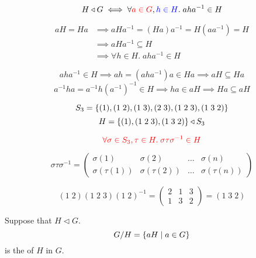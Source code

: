 \begin{frame}
  \begin{theorem}
    \[
      H \triangleleft G \iff \forall \textcolor{red}{a \in G}, \textcolor{blue}{h \in H}.\; aha^{-1} \in H
    \]
  \end{theorem}

  \pause
  \begin{align*}
    aH = Ha &\implies aHa^{-1} = (Ha)a^{-1} = H(aa^{-1}) = H \\
            &\implies aHa^{-1} \subseteq H \\
            &\implies \forall h \in H.\; aha^{-1} \in H
  \end{align*}

  \pause
  \[
    aha^{-1} \in H \implies ah = (aha^{-1})a \in Ha \implies aH \subseteq Ha
  \]
  \pause
  \[
    a^{-1}ha = a^{-1}h(a^{-1})^{-1} \in H \implies ha \in aH \implies Ha \subseteq aH
  \]
\end{frame}

\begin{frame}
  \begin{exampleblock}{}
    \[
      S_{3} = \{(1), (1\; 2), (1\; 3), (2\; 3), (1\; 2\; 3), (1\; 3\; 2)\}
    \]
    \[
      H = \{(1), (1\; 2\; 3), (1\; 3\; 2)\} \triangleleft S_{3}
    \]
  \end{exampleblock}

  \pause
  \[
    \textcolor{red}{\forall \sigma \in S_{3}, \tau \in H.\; \sigma \tau \sigma^{-1} \in H}
  \]

  \pause
  \begin{theorem}
    \[
      \sigma \tau \sigma^{-1} = \begin{pmatrix}
        \sigma(1) & \sigma(2) & \dots & \sigma(n) \\
        \sigma(\tau(1)) & \sigma(\tau(2)) & \dots & \sigma(\tau(n))
      \end{pmatrix}
    \]
  \end{theorem}

  \pause
  \[
    (1\;2) (1\;2\;3) (1\;2)^{-1} = \begin{pmatrix}
      2 & 1 & 3 \\
      1 & 3 & 2
    \end{pmatrix} = (1\; 3\; 2)
  \]
\end{frame}

\begin{frame}
  \begin{definition}[正规子群的陪集]
    Suppose that $H \triangleleft G$.
    \[
      G/H = \{aH \mid a \in G\}
    \]
    is the  of $H$ in $G$.
  \end{definition}
\end{frame}

